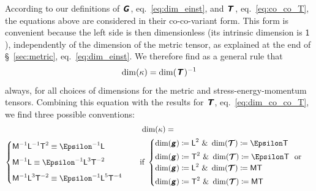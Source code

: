 \documentclass[\ifafour a4paper,12pt,\else a5paper,10pt,\fi%
onecolumn,oneside,article,%
british%
]{memoir}
\makeatletter
\theoremstyle{remark}
\theoremstyle{innote}
\newcommand*{\mathte}[1]{\textbf{\textit{\textsf{#1}}}}
\newcommand*{\amp}{\&}
\newcommand*{\defd}{\coloneqq}
\renewcommand*{\|}[1][]{\nonscript\,#1\vert\nonscript\;\mathopen{}}
\newcommand*{\sect}{\S}%
\newcommand*{\eqn}{eq.}%
\newcommand*{\q}{}%
\DeclareRobustCommand*{\q}{%
  \mathord{\mathpalette\bigcdot@{}}%
}
\newcommand*{\bigcdot@scalefactor}{0.7}
\newcommand*{\bigcdot@widthfactor}{1.5}
\newcommand*{\bigcdot@}[2]{%
  \sbox0{$#1\vcenter{}$}%
  \sbox2{$#1\cdot\m@th$}%
  \hbox to \bigcdot@widthfactor\wd2{%
    \hfil
    \raise\ht0\hbox{%
      \scalebox{\bigcdot@scalefactor}{%
        \lower\ht0\hbox{$#1\bullet\m@th$}%
      }%
    }%
    \hfil
  }%
}
\newcommand*{\Un}{\textsf{1}}
\newcommand*{\Le}{\textsf{L}}
\newcommand*{\Ti}{\textsf{T}}
\newcommand*{\Ma}{\textsf{M}}
\newcommand*{\En}{\Epsilon}%
\newcommand*{\yg}{\mathte{g}}
\newcommand*{\yT}{\bm{\mathcal{T}}}
\newcommand*{\yTe}{\mathte{T}}
\newcommand*{\yG}{\mathte{G}}
\renewcommand*{\i}{\indices}
\newcommand*{\yk}{\kappa}
\makeatother
\begin{document}
According to our definitions of $\yG\i{_{\q\q}}$,
\eqn~\eqref{eq:dim_einst}, and $\yTe\i{_{\q\q}}$, \eqn~\eqref{eq:co_co_T},
the equations above are considered in their co-co-variant form. This form
is convenient because the left side is then dimensionless (its intrinsic
dimension is $\Un$), independently of the dimension of the metric tensor,
as explained at the end of \sect~\ref{sec:metric},
\eqn~\eqref{eq:dim_einst}. We therefore find as a general rule that
\begin{equation}
  \label{eq:dim_k_general}
  \dim(\yk) = \dim(\yTe\i{_{\q\q}})^{-1} 
\end{equation}
always, for all choices of dimensions for the metric and
stress-energy-momentum tensors. Combining this equation with the results
for $\yTe$, \eqn~\eqref{eq:dim_co_co_T}, we find three possible
conventions:
\begin{multline}
\label{eq:dim_k_choices}
\dim(\yk) ={}\\
  \begin{cases}
\Ma^{-1}\Le^{-1}\Ti^{2} \equiv \En^{-1}\Le \\[2\jot]
\Ma^{-1}\Le \equiv \En^{-1}\Le^{3}\Ti^{-2} \\[2\jot]
\Ma^{-1}\Le^{3}\Ti^{-2} \equiv \En^{-1}\Le^{5}\Ti^{-4}
  \end{cases}
  \quad\text{if }
  \begin{cases}
\dim(\yg)\defd \Le^2 \text{ \amp\ }\dim(\yT)\defd \En\Ti \\[\jot]
    \dim(\yg)\defd \Ti^2 \text{ \amp\ }\dim(\yT)\defd \En\Ti 
    \ \text{ or }\\
\dim(\yg)\defd \Le^2 \text{ \amp\ }\dim(\yT)\defd \Ma\Ti \\[\jot]
\dim(\yg)\defd \Ti^2 \text{ \amp\ }\dim(\yT)\defd \Ma\Ti
  \end{cases}
\end{multline}
\end{document}
